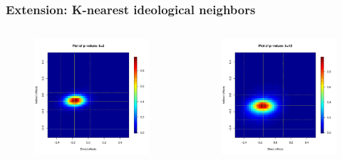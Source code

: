 \documentclass{beamer}
\begin{document}
\begin{frame}
\frametitle{Extension: K-nearest ideological neighbors}
\begin{columns}[c]

\begin{figure}
\centering
\includegraphics[scale=0.35]{pval_plot_coppock_ideo_3nn.pdf}
\end{figure}

\begin{figure}
\centering
\includegraphics[scale=0.35]{pval_plot_coppock_ideo_12nn.pdf}
\end{figure}

\end{columns}
\end{frame}
\end{document}
